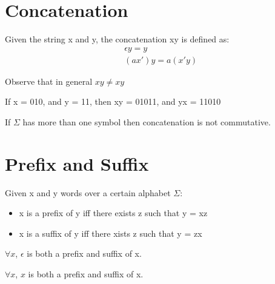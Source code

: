 \section{Concatenation} %
\label{sec:concatenation}
\begin{Def}
    Given the string x and y, the concatenation xy is defined as:
    \begin{align*}
        &\epsilon y = y\\
        &(ax')y = a(x'y)
    \end{align*}
\end{Def}
\noindent
Observe that in general $xy \neq xy$
\begin{Ex}
    If x = 010, and y = 11, then xy = 01011, and yx = 11010
\end{Ex}
\begin{Lem}
    If $\Sigma$ has more than one symbol then concatenation is not commutative.
\end{Lem}

\section{Prefix and Suffix} %
\label{sec:prefix_and_suffix}
\begin{Def}
    Given x and y words over a certain alphabet $\Sigma$:
    \begin{itemize}
        \item x is a {\color{red} prefix} of y iff there exists z such that y = xz
        \item x is a {\color{red} suffix} of y iff there xists z such that y = zx
    \end{itemize}
\end{Def}
\begin{Rem}
    $\forall x$, $\epsilon$ is both a prefix and suffix of x.
\end{Rem}
\begin{Rem}
    $\forall x$, $x$ is both a prefix and suffix of x.
\end{Rem}

